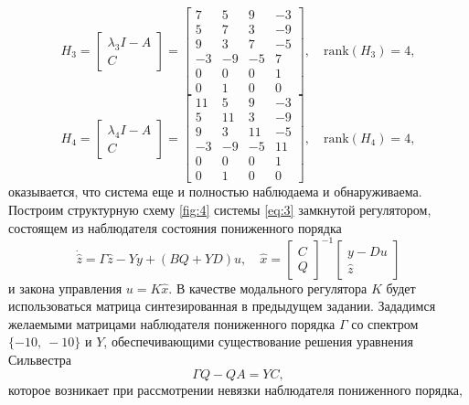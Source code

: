\begin{equation*}
H_3 = \begin{bmatrix}
    \lambda_3 I - A \\ C
    \end{bmatrix} =
\begin{bmatrix}
    7 & 5 & 9 & -3 \\
    5 & 7 & 3 & -9 \\
    9 & 3 & 7 & -5 \\
    -3 & -9 & -5 & 7 \\
    0 & 0 & 0 & 1 \\
    0 & 1 & 0 & 0
\end{bmatrix},\quad
\text{rank}(H_3) = 4,
\end{equation*}
\begin{equation*}
H_4 = \begin{bmatrix}
    \lambda_4 I - A \\ C
    \end{bmatrix} =
\begin{bmatrix}
    11 & 5 & 9 & -3 \\
    5 & 11 & 3 & -9 \\
    9 & 3 & 11 & -5 \\
    -3 & -9 & -5 & 11 \\
    0 & 0 & 0 & 1 \\
    0 & 1 & 0 & 0
\end{bmatrix},\quad
\text{rank}(H_4) = 4,
\end{equation*}
оказывается, что система еще и полностью наблюдаема и обнаруживаема.
Построим структурную схему \autoref{fig:4} системы \ref{eq:3} замкнутой регулятором,
состоящем из наблюдателя состояния пониженного порядка
$$
\dot{\hat z}=\Gamma\hat z-Yy+(BQ+YD)u,\quad \hat x=\begin{bmatrix}
    C\\ Q
\end{bmatrix}^{-1}\begin{bmatrix}
    y-Du\\ \hat z
\end{bmatrix}
$$ и закона управления $u=K\hat x.$ В качестве модального регулятора
$K$ будет использоваться матрица синтезированная в предыдущем задании.
Зададимся желаемыми матрицами наблюдателя пониженного порядка $\Gamma$ со спектром
$\{-10,\ -10\}$ и $Y$, обеспечивающими существование решения уравнения Сильвестра 
\begin{equation*}
    \Gamma Q-QA=YC,
\end{equation*}
которое возникает при рассмотрении невязки наблюдателя пониженного порядка,
